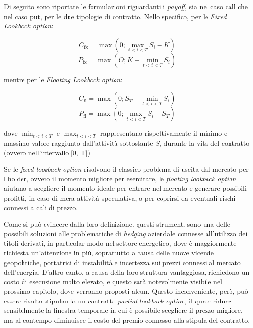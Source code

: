 \documentclass[12pt,a4paper]{report}
\begin{document}
Di seguito sono riportate le formulazioni riguardanti i \textit{payoff}, sia nel caso call che nel caso put, per le due tipologie di contratto.
Nello specifico, per le \textit{Fixed Lookback option}:

\begin{equation}
    C_{\text{fx}} = \max (0; \max_{t < i < T} S_i - K)
\end{equation}
\begin{equation}
    P_{\text{fx}} = \max (O; K - \min_{t < i < T} S_i)
\end{equation}


mentre per le \textit{Floating Lookback option}:

\begin{equation}
    C_{\text{fl}} = \max (0; S_T - \min_{t < i < T} S_i) 
\end{equation}
\begin{equation}
    P_{\text{fl}} = \max (0; \max_{t < i < T} S_i - S_T)
\end{equation}

dove $\min_{t < i < T}$ e \(\max_{t < i < T}\) rappresentano rispettivamente il minimo e massimo valore raggiunto dall'attività sottostante $S_i$ durante la vita del contratto (ovvero nell'intervallo [0, T])

Se le \textit{fixed lookback option} risolvono il classico problema di uscita dal mercato per l'holder, ovvero il momento migliore per esercitare, le \textit{floating lookback option} aiutano a scegliere il momento ideale per entrare nel mercato e generare possibili profitti, in caso di mera attività speculativa, o per coprirsi da eventuali rischi connessi a cali di prezzo. 

Come si può evincere dalla loro definizione, questi strumenti sono una delle possibili soluzioni alle problematiche di \textit{hedging} aziendale connesse all'utilizzo dei titoli derivati, in particolar modo nel settore energetico, dove è maggiormente richiesta un'attenzione in più, soprattutto a causa delle nuove vicende geopolitiche, portatrici di instabilità e incertezza sui prezzi connessi al mercato dell'energia.
D'altro canto, a causa della loro struttura vantaggiosa, richiedono un costo di esecuzione molto elevato, e questo sarà notevolmente visibile nel prossimo capitolo, dove verranno proposti alcun. Questo inconveniente, però, può essere risolto stipulando un contratto \textit{partial lookback option}, il quale riduce sensibilmente la finestra temporale in cui è possibile scegliere il prezzo migliore, ma al contempo diminuisce il costo del premio connesso alla stipula del contratto.
\end{document}
